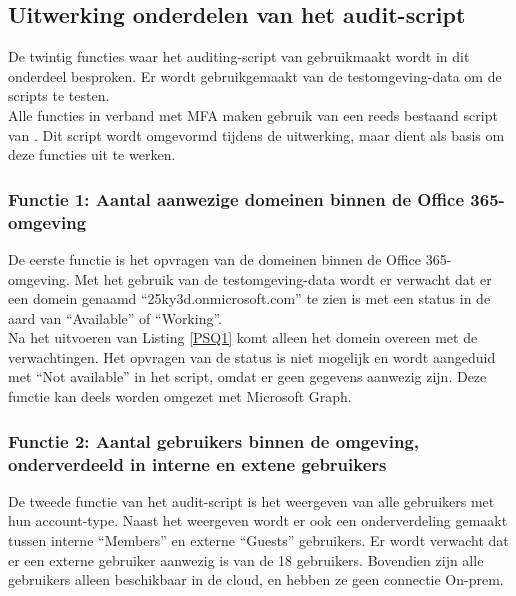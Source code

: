 \subsection{Uitwerking onderdelen van het audit-script}


De twintig functies waar het auditing-script van gebruikmaakt wordt in dit onderdeel besproken. Er wordt gebruikgemaakt van de testomgeving-data om de scripts te testen. \\

Alle functies in verband met \ac{MFA} maken gebruik van een reeds bestaand script van \textcite{Allen2023}. Dit script wordt omgevormd tijdens de uitwerking, maar dient als basis om deze functies uit te werken.

\subsubsection{Functie 1: Aantal aanwezige domeinen binnen de Office 365-omgeving}

De eerste functie is het opvragen van de domeinen binnen de Office 365-omgeving. Met het gebruik van de testomgeving-data wordt er verwacht dat er een domein genaamd “25ky3d.onmicrosoft.com” te zien is met een status in de aard van “Available” of “Working”. \\

Na het uitvoeren van Listing \ref{PSQ1} komt alleen het domein overeen met de verwachtingen. Het opvragen van de status is niet mogelijk en wordt aangeduid met “Not available” in het script, omdat er geen gegevens aanwezig zijn. Deze functie kan deels worden omgezet met Microsoft Graph.

\subsubsection{Functie 2: Aantal gebruikers binnen de omgeving, onderverdeeld in interne en extene gebruikers}

De tweede functie van het audit-script is het weergeven van alle gebruikers met hun account-type. Naast het weergeven wordt er ook een onderverdeling gemaakt tussen interne “Members” en externe “Guests” gebruikers. Er wordt verwacht dat er een externe gebruiker aanwezig is van de 18 gebruikers. Bovendien zijn alle gebruikers alleen beschikbaar in de cloud, en hebben ze geen connectie \ac{On-prem}. \\

